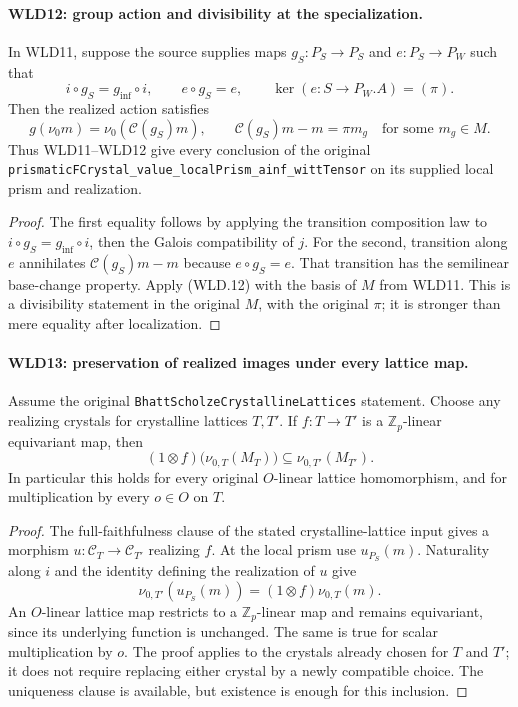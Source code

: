 \paragraph{WLD12: group action and divisibility at the specialization.}
\label{claim:WLD12}
In WLD11, suppose the source supplies maps
$g_S:P_S\to P_S$ and $e:P_S\to P_W$ such that
\[
 i\circ g_S=g_{\inf}\circ i,\qquad e\circ g_S=e,\qquad
                         \ker(e:S\to P_W.A)=(\pi).
\]
Then the realized action satisfies
\[
 g(\nu_0m)=\nu_0(\mathcal C(g_S)m),\qquad
                 \mathcal C(g_S)m-m=\pi m_g
                         \quad\text{for some }m_g\in M.    \tag{WLD.14}
\]
Thus WLD11--WLD12 give every conclusion of the original
\texttt{prismatic\allowbreak FCrystal\_\allowbreak value\_\allowbreak local\allowbreak Prism\_\allowbreak ainf\_\allowbreak witt\allowbreak Tensor}
on its supplied local prism and realization.

\begin{proof}
The first equality follows by applying the transition composition
law to $i\circ g_S=g_{\inf}\circ i$, then the Galois compatibility
of $j$. For the second, transition along $e$ annihilates
$\mathcal C(g_S)m-m$ because $e\circ g_S=e$.
That transition has the semilinear base-change property.
Apply (WLD.12) with the basis of $M$ from WLD11.
This is a divisibility statement in the original $M$, with the
original $\pi$; it is stronger than mere equality after localization.
\end{proof}

\paragraph{WLD13: preservation of realized images under every lattice map.}
\label{claim:WLD13}
Assume the original \texttt{Bhatt\allowbreak Scholze\allowbreak Crystalline\allowbreak Lattices}
statement. Choose any realizing crystals for crystalline lattices
$T,T'$. If $f:T\to T'$ is a $\mathbb Z_p$-linear equivariant map,
then
\[
 (1\otimes f)\bigl(\nu_{0,T}(M_T)\bigr)
                          \subseteq \nu_{0,T'}(M_{T'}).    \tag{WLD.15}
\]
In particular this holds for every original $O$-linear lattice
homomorphism, and for multiplication by every $o\in O$ on $T$.

\begin{proof}
The full-faithfulness clause of the stated crystalline-lattice input
gives a morphism $u:\mathcal C_T\to\mathcal C_{T'}$ realizing $f$.
At the local prism use $u_{P_S}(m)$. Naturality along $i$ and the
identity defining the realization of $u$ give
\[
 \nu_{0,T'}(u_{P_S}(m))
       =(1\otimes f)\nu_{0,T}(m).
\]
An $O$-linear lattice map restricts to a $\mathbb Z_p$-linear map
and remains equivariant, since its underlying function is unchanged.
The same is true for scalar multiplication by $o$.
The proof applies to the crystals already chosen for $T$ and $T'$;
it does not require replacing either crystal by a newly compatible
choice. The uniqueness clause is available, but existence is enough
for this inclusion.
\end{proof}

